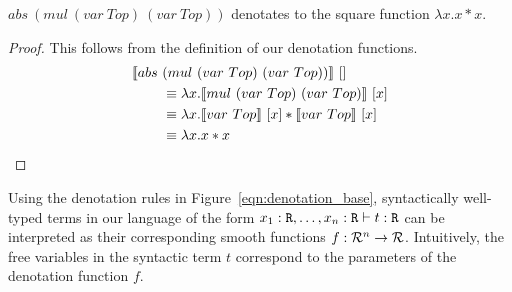 



  \begin{example}[Square]
    $abs\ (mul\ (var\ Top)\ (var\ Top))$ denotates to the square function $\lambda x. x * x$.
    \begin{proof}
      This follows from the definition of our denotation functions.
      \begin{align*}
        \llbracket abs\ &(mul\ (var\ Top)\ (var\ Top)) \rrbracket\ [] \\
          &\equiv \lambda x.
            \llbracket mul\ (var\ Top)\ (var\ Top) \rrbracket\ [x] \\
          &\equiv \lambda x.
            \llbracket var\ Top \rrbracket\ [x] *
              \llbracket var\ Top \rrbracket\ [x] \\
          &\equiv \lambda x. x * x \qedhere
      \end{align*}
    \end{proof}
  \end{example}


  Using the denotation rules in Figure~\ref{eqn:denotation_base}, syntactically well-typed terms in our language of the form $x_1 : \texttt{R}, \dots, x_n : \texttt{R} \vdash t : \texttt{R}$ can be interpreted as their corresponding smooth functions $f : \mathcal{R}^n \to \mathcal{R}$.
  Intuitively, the free variables in the syntactic term $t$ correspond to the parameters of the denotation function $f$.

